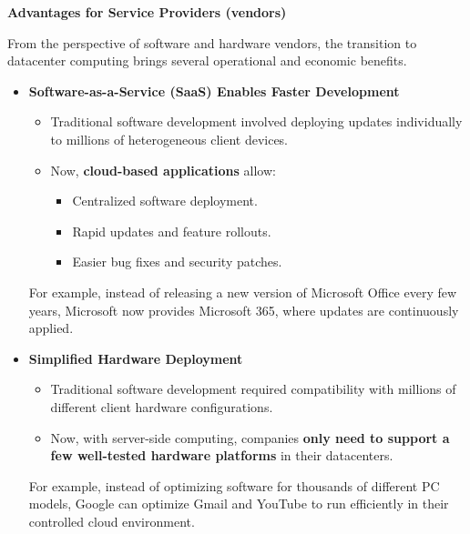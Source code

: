 \newpage

\begin{flushleft}
    \textcolor{Green3}{ \textbf{Advantages for Service Providers (vendors)}}
\end{flushleft}
From the perspective of software and hardware vendors, the transition to datacenter computing brings several operational and economic benefits.
\begin{itemize}
    \item \textcolor{Green3}{\textbf{Software-as-a-Service (SaaS) Enables Faster Development}}
    \begin{itemize}
        \item[\textcolor{Red2}{\faIcon{times}}] Traditional software development involved deploying updates individually to millions of heterogeneous client devices.
        \item[\textcolor{Green3}{\faIcon{check}}] Now, \textbf{cloud-based applications} allow:
        \begin{itemize}
            \item Centralized software deployment.
            \item Rapid updates and feature rollouts.
            \item Easier bug fixes and security patches.
        \end{itemize}
    \end{itemize}
    For example, instead of releasing a new version of Microsoft Office every few years, Microsoft now provides Microsoft 365, where updates are continuously applied.

    \item \textcolor{Green3}{\textbf{Simplified Hardware Deployment}}
    \begin{itemize}
        \item[\textcolor{Red2}{\faIcon{times}}] Traditional software development required compatibility with millions of different client hardware configurations.
        \item[\textcolor{Green3}{\faIcon{check}}] Now, with server-side computing, companies \textbf{only need to support a few well-tested hardware platforms} in their datacenters.
    \end{itemize}
    For example, instead of optimizing software for thousands of different PC models, Google can optimize Gmail and YouTube to run efficiently in their controlled cloud environment.
    

\end{itemize}
